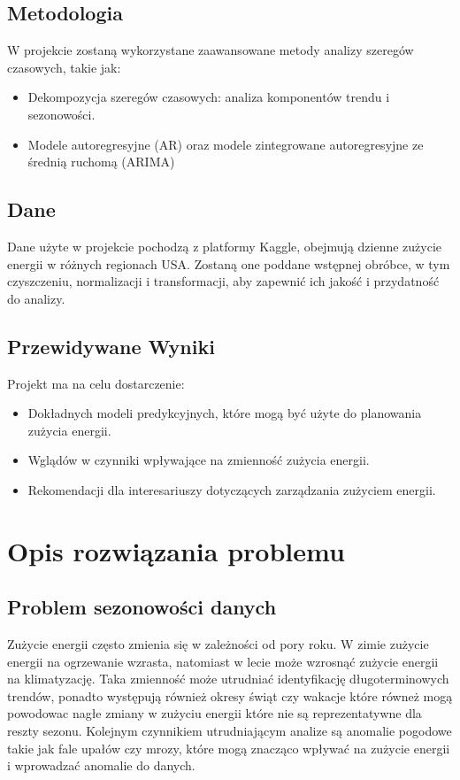 \documentclass{article}
\begin{document}
\subsection{Metodologia}

W projekcie zostaną wykorzystane zaawansowane metody analizy szeregów czasowych, takie jak:

\begin{itemize}
    \item Dekompozycja szeregów czasowych: analiza komponentów trendu i sezonowości.
    \item Modele autoregresyjne (AR) oraz modele zintegrowane autoregresyjne ze średnią ruchomą (ARIMA)
\end{itemize}

\subsection{Dane}

Dane użyte w projekcie pochodzą z platformy Kaggle, obejmują dzienne zużycie energii w różnych regionach USA. Zostaną one poddane wstępnej obróbce, w tym czyszczeniu, normalizacji i transformacji, aby zapewnić ich jakość i przydatność do analizy.

\subsection{Przewidywane Wyniki}

Projekt ma na celu dostarczenie:

\begin{itemize}
    \item Dokładnych modeli predykcyjnych, które mogą być użyte do planowania zużycia energii.
    \item Wglądów w czynniki wpływające na zmienność zużycia energii.
    \item Rekomendacji dla interesariuszy dotyczących zarządzania zużyciem energii.
\end{itemize}

\section{Opis rozwiązania problemu}
\subsection{Problem sezonowości danych}
 Zużycie energii często zmienia się w zależności od pory roku. W zimie zużycie energii na ogrzewanie wzrasta, natomiast w lecie może wzrosnąć zużycie energii na klimatyzację. Taka zmienność może utrudniać identyfikację długoterminowych trendów, ponadto występują również okresy świąt czy wakacje które równeż mogą powodowac nagłe zmiany w zużyciu energii które nie są reprezentatywne dla reszty sezonu.
 Kolejnym czynnikiem utrudniającym analize są anomalie pogodowe takie jak fale upałów czy mrozy, które mogą znacząco wpływać na zużycie energii i wprowadzać anomalie do danych.
 
\end{document}
